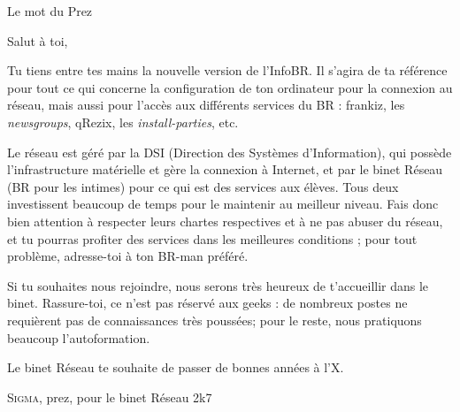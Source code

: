 
\begin{center}
    { \Huge Le mot du Prez }
\end{center}

\indent \indent Salut \`a toi,

Tu tiens entre tes mains la nouvelle version de l'InfoBR. Il s'agira de ta référence pour tout ce qui concerne la configuration de ton ordinateur pour la connexion au réseau, mais aussi pour l'accès aux différents services du BR :
frankiz, les \emph{newsgroups}, qRezix, les \emph{install-parties}, etc.

Le réseau est géré par la DSI (Direction des Systèmes d'Information), qui possède l'infrastructure matérielle et gère la connexion \`a Internet,
et par le binet Réseau (BR pour les intimes) pour ce qui est des services aux élèves. Tous deux investissent beaucoup de temps pour le maintenir au meilleur niveau.
Fais donc bien attention \`a respecter leurs chartes respectives et \`a ne pas abuser du réseau, et tu pourras profiter des services dans les meilleures conditions ; pour tout problème, adresse-toi à ton
BR-man préféré.

Si tu souhaites nous rejoindre, nous serons très heureux de t'accueillir dans le binet. Rassure-toi, ce n'est pas réservé aux geeks : de nombreux postes ne requièrent pas de connaissances très poussées; pour le reste, nous pratiquons beaucoup l'autoformation.

Le binet Réseau te souhaite de passer de bonnes années \`a l'X.\\



\begin{flushright}
    \textsc{Sigma}, prez, pour le binet Réseau 2k7 
\end{flushright}

